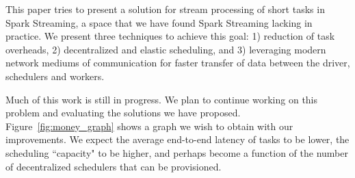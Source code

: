 \noindent

This paper tries to present a solution for stream processing of short tasks in Spark Streaming, a space that we have found Spark Streaming lacking in practice.
We present three techniques to achieve this goal: 1) reduction of task overheads, 2) decentralized and elastic scheduling, and 3) leveraging modern network mediums of communication for faster transfer of data between the driver, schedulers and workers.

Much of this work is still in progress. We plan to continue working on this problem and evaluating the solutions we have proposed. Figure~\ref{fig:money_graph} shows a graph we wish to obtain with our improvements. We expect the average end-to-end latency of tasks to be lower, the scheduling ``capacity" to be higher, and perhaps become a function of the number of decentralized schedulers that can be provisioned.
